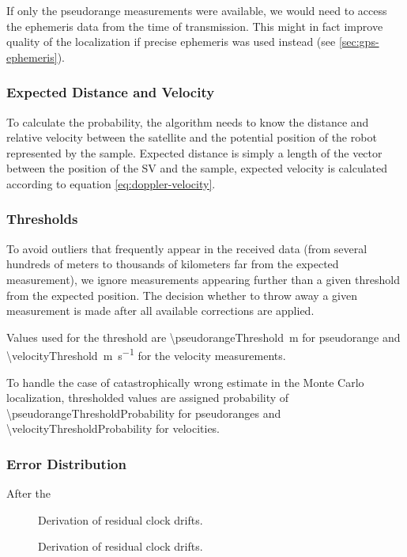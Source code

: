 If only the pseudorange measurements were available, we would need to access the
ephemeris data from the time of transmission.
This might in fact improve quality of the localization if precise ephemeris
was used instead (see \cref{sec:gps-ephemeris}).

\subsubsection{Expected Distance and Velocity}
To calculate the probability, the algorithm needs to know the distance and relative
velocity between the satellite and the potential position of the robot represented
by the sample.
Expected distance is simply a length of the vector between the position of the SV
and the sample, expected velocity is calculated according to equation \eqref{eq:doppler-velocity}.

\subsubsection{Thresholds}
To avoid outliers that frequently appear in the received data (from several hundreds
of meters to thousands of kilometers far from the expected measurement), we
ignore measurements appearing further than a given threshold from the expected position.
The decision whether to throw away a given measurement is made after all available corrections
are applied.

Values used for the threshold are \SI{\pseudorangeThreshold}{\meter} for pseudorange
and \SI{\velocityThreshold}{\meter\per\second} for the velocity measurements.

To handle the case of catastrophically wrong estimate in the Monte Carlo localization,
thresholded values are assigned probability of \num{\pseudorangeThresholdProbability} for
pseudoranges and \num{\velocityThresholdProbability} for velocities.

\subsubsection{Error Distribution}
After the 

\begin{figure}[p]
	\centering
	\caption{Derivation of residual clock drifts.}
	\label{fig:}
\end{figure}

\begin{figure}[p]
	\centering
	\caption{Derivation of residual clock drifts.}
	\label{fig:residual-clock-drift-derivation}
\end{figure}


